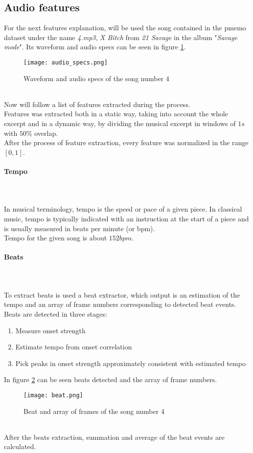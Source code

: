 \subsection{Audio features}
For the next features explanation, will be used the song contained in the \gls{pmemo} dataset under the name \textit{4.mp3}, \textit{X Bitch} from \textit{21 Savage} in the album "\textit{Savage mode}". Its waveform and audio specs can be seen in figure \ref{fig:audio_specs}.
\begin{figure}[h]
    \centering
    \texttt{[image: audio\_specs.png]} 
	\caption{Waveform and audio specs of the song number 4}
    \label{fig:audio_specs}
\end{figure}
\\
Now will follow a list of features extracted during the process.
\\
Features was extracted both in a static way, taking into account the whole excerpt and in a dynamic way, by dividing the musical excerpt in windows of $1s$ with $50\%$ overlap.
\\
After the process of feature extraction, every feature was normalized in the range $[0,1]$.
\paragraph{Tempo}
\mbox{} \\ \\
In musical terminology, tempo  is the speed or pace of a given piece. In classical music, tempo is typically indicated with an instruction at the start of a piece and is usually measured in beats per minute (or bpm).
\\
Tempo for the given song is about $152 bpm$.

\paragraph{Beats}
\mbox{} \\ \\
To extract beats is used a beat extractor, which output is an estimation of the tempo and an array of frame numbers corresponding to detected beat events.
\\
Beats are detected in three stages:
\begin{enumerate}	
	\item Measure onset strength
	\item Estimate tempo from onset correlation
	\item Pick peaks in onset strength approximately consistent with estimated tempo
\end{enumerate}
In figure \ref{fig:beat} can be seen beats detected and the array of frame numbers.
\begin{figure}[h]
    \centering
    \texttt{[image: beat.png]} 
	\caption{Beat and array of frames of the song number 4}
    \label{fig:beat}
\end{figure}
\\
After the beats extraction, summation and average of the beat events are calculated.

